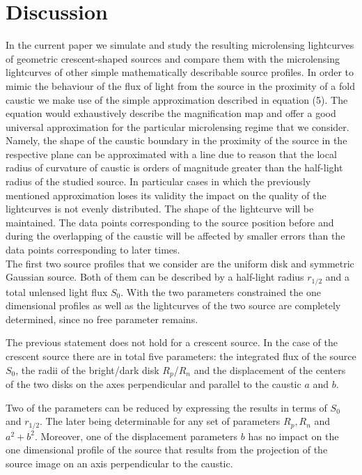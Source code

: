 \section{Discussion}\label{sec:discussion}

In the current paper we simulate and study the resulting microlensing lightcurves of geometric crescent-shaped sources 
and compare them with the microlensing lightcurves of other simple mathematically describable source profiles. 
In order to mimic the behaviour of the flux of light from the source in the proximity of a fold caustic we make use of the simple approximation described in equation (5). 
The equation would exhaustively describe the magnification map and offer a good universal approximation for the 
particular microlensing regime that we consider. 
Namely, the shape of the caustic boundary in the proximity of the source in the respective plane can be approximated with
 a line due to reason that the local radius of curvature of caustic is orders of magnitude greater than the half-light
 radius of the studied source. 
In particular cases in which the previously mentioned approximation loses its validity the impact on the quality of the 
lightcurves is not evenly distributed. The shape of the lightcurve will be maintained. 
The data points corresponding to the source position before and during the overlapping of the caustic will be affected by
 smaller errors than the data points corresponding to later times. \\

The first two source profiles that we consider are the uniform disk and symmetric Gaussian source. 
Both of them can be described by a half-light radius $r_{1/2}$ and a total unlensed light flux $S_0$. 
With the two parameters constrained the one dimensional profiles as well as the lightcurves of the two source are completely determined, since no free parameter remains. 

The previous statement does not hold for a crescent source.
In the case of the crescent source there are in total five parameters: the integrated flux of the source $S_0$,
 the radii of the bright/dark disk $R_p$/$R_n$ and the displacement of the centers of the two disks on the axes perpendicular and parallel to the caustic $a$ and $b$. 

Two of the parameters can be reduced by expressing the results in terms of $S_0$ and $r_{1/2}$. 
The later being determinable for any set of parameters $R_p, R_n$ and $a^2+b^2$. Moreover, one of the displacement 
parameters $b$ has no impact on the one dimensional profile of the source that results from the projection of the source image on an axis perpendicular to the caustic. 

